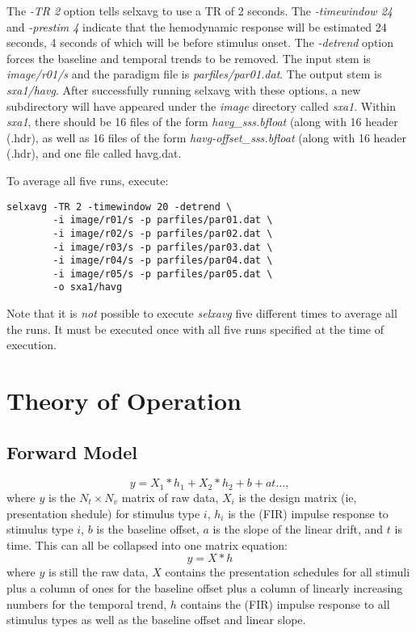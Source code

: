 \documentclass[10pt]{article}
\begin{document}
The {\em -TR 2} option tells selxavg to use a TR of 2 seconds.  The
{\em -timewindow 24} and {\em -prestim 4} indicate that the
hemodynamic response will be estimated 24 seconds, 4 seconds of which
will be before stimulus onset.  The {\em -detrend} option forces the
baseline and temporal trends to be removed. The input stem is {\em
image/r01/s} and the paradigm file is {\em parfiles/par01.dat}. The
output stem is {\em sxa1/havg}.  After successfully running selxavg
with these options, a new subdirectory will have appeared under the
{\em image} directory called {\em sxa1}. Within {\em sxa1}, there
should be 16 files of the form {\em havg\_sss.bfloat} (along with 16
header (.hdr), as well as 16 files of the form {\em
havg-offset\_sss.bfloat} (along with 16 header (.hdr), and one file
called havg.dat.

To average all five runs, execute:
\begin{verbatim}
selxavg -TR 2 -timewindow 20 -detrend \
        -i image/r01/s -p parfiles/par01.dat \
        -i image/r02/s -p parfiles/par02.dat \
        -i image/r03/s -p parfiles/par03.dat \
        -i image/r04/s -p parfiles/par04.dat \
        -i image/r05/s -p parfiles/par05.dat \
        -o sxa1/havg 
\end{verbatim}

Note that it is {\em not} possible to execute {\em selxavg} five different
times to average all the runs.  It must be executed once with all
five runs specified at the time of execution.

\section{Theory of Operation}

\subsection{Forward Model}

\begin{equation}
y = X_1 * h_1 + X_2 * h_2 + b + a t\ldots,
\end{equation}
where $y$ is the $N_t \times N_v$ matrix of raw data, $X_i$ is the
design matrix (ie, presentation shedule) for stimulus type $i$, $h_i$
is the (FIR) impulse response to stimulus type $i$, $b$ is the
baseline offset, $a$ is the slope of the linear drift, and $t$ is
time. This can all be collapsed into one matrix equation:
\begin{equation}
y = X * h  
\end{equation}
where $y$ is still the raw data, $X$ contains the presentation
schedules for all stimuli plus a column of ones for the baseline
offset plus a column of linearly increasing numbers for the temporal
trend, $h$ contains the (FIR) impulse response to all stimulus types
as well as the baseline offset and linear slope.
\end{document}
